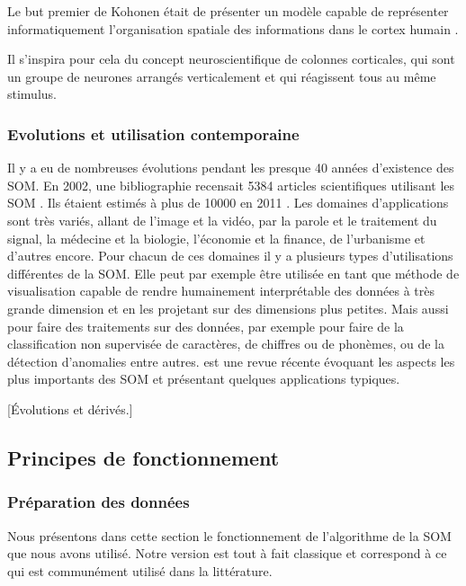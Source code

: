 	Le but premier de Kohonen était de présenter un modèle capable de représenter informatiquement l'organisation spatiale des informations dans le cortex humain \cite{kohonen-memory}. 
	
	Il s'inspira pour cela du concept neuroscientifique de colonnes corticales, qui sont un groupe de neurones arrangés verticalement et qui réagissent tous au même stimulus.

\subsubsection{Evolutions et utilisation contemporaine}
	Il y a eu de nombreuses évolutions pendant les presque 40 années d'existence des SOM. En 2002, une bibliographie recensait 5384 articles scientifiques utilisant les SOM \cite{oja2003bibliography}. Ils étaient estimés à plus de 10000 en 2011 \cite{bilbiography-finuni}. Les domaines d'applications sont très variés, allant de l'image et la vidéo, par la parole et le traitement du signal, la médecine et la biologie, l'économie et la finance, de l'urbanisme et d'autres encore. Pour chacun de ces domaines il y a plusieurs types d'utilisations différentes de la SOM. Elle peut par exemple être utilisée en tant que méthode de visualisation capable de rendre humainement interprétable des données à très grande dimension et en les projetant sur des dimensions plus petites. Mais aussi pour faire des traitements sur des données, par exemple pour faire de la classification non supervisée de caractères, de chiffres ou de phonèmes, ou de la détection d'anomalies entre autres. \cite{cottrell2018self} est une revue récente évoquant les aspects les plus importants des SOM et présentant quelques applications typiques. 

	[Évolutions et dérivés.]

\subsection{Principes de fonctionnement}
\subsubsection{Préparation des données}

	Nous présentons dans cette section le fonctionnement de l'algorithme de la SOM que nous avons utilisé. Notre version est tout à fait classique et correspond à ce qui est communément utilisé dans la littérature.\\

